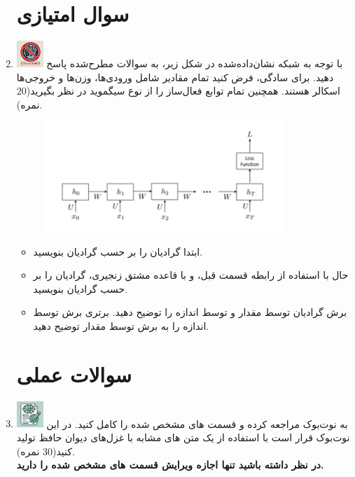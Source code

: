 \documentclass[12pt]{article}
\begin{document}
\begin{enumerate}
\begin{itemize}
    \end{itemize}
    \section*{سوال امتیازی}
    \item \includegraphics[width=1cm]{figs/Forbidden_AI.jpg}
    با توجه به شبکه نشان‌داده‌شده در شکل زیر، به سوالات مطرح‌شده پاسخ دهید. برای سادگی، فرض کنید تمام مقادیر شامل ورودی‌ها، وزن‌ها و خروجی‌ها اسکالر هستند. همچنین تمام توابع فعال‌ساز را از نوع سیگموید  در نظر بگیرید(20 نمره).
    \begin{figure}[h]  
        \centering
        \includegraphics[width=0.85\textwidth]{figs/Q4.png}
        \label{fig:num_pic}  
    \end{figure}

    \begin{itemize}
        \item ابتدا گرادیان  را بر حسب گرادیان  بنویسید.
        \item 	حال با استفاده از رابطه قسمت قبل، و با قاعده مشتق زنجیری، گرادیان  را بر حسب گرادیان  بنویسید.
        \item برش گرادیان توسط مقدار و توسط اندازه را توضیح دهید. برتری برش توسط اندازه را به برش توسط مقدار توضیح دهید.
    \end{itemize}
    	
    \section*{سوالات عملی} 
    \item \includegraphics[width=1cm]{figs/Allowed_with_contributino.jpg}
    به نوت‌بوک  مراجعه کرده و قسمت های مشخص شده را کامل کنید. در این نوت‌بوک قرار است با استفاده از یک   متن های مشابه با غزل‌های دیوان حافظ تولید کنید(30 نمره). \\
    \textbf{در نظر داشته باشید تنها اجازه ویرایش قسمت های مشخص شده را دارید.}


\end{enumerate}
\end{document}
